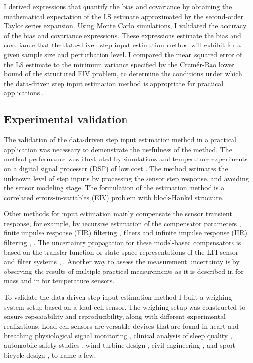 I derived expressions that quantify the bias and covariance by obtaining the mathematical expectation of the LS estimate approximated by the second-order Taylor series expansion.
Using Monte Carlo simulations, I validated the accuracy of the bias and covariance expressions.
These expressions estimate the bias and covariance that the data-driven step input estimation method will exhibit for a given sample size and perturbation level.
I compared the mean squared error of the LS estimate to the minimum variance specified by the Cram\'er-Rao lower bound of the structured EIV problem, to determine the conditions under which the data-driven step input estimation method is appropriate for practical applications \citep{QuintanaCSDA}.


\subsection{Experimental validation}

The validation of the data-driven step input estimation method in a practical application was necessary to demonstrate the usefulness of the method.
The method performance was illustrated by simulations and temperature experiments on a digital signal processor (DSP) of low cost \citep{Markovsky15cep}.
The method estimates the unknown level of step inputs by processing the sensor step response, and 
avoiding the sensor modeling stage.
The formulation of the estimation method is a correlated errors-in-variables (EIV) problem with block-Hankel structure.

Other methods for input estimation mainly compensate the sensor transient response, for example, by 
recursive estimation of the compensator parameters \citep{Shu93}, 
finite impulse response (FIR) filtering \citep{Elster07}, \citep{Niedzwiecki16b} filters and 
infinite impulse response (IIR) filtering \citep{Pintelon90}, \citep{Elster08}.
The uncertainty propagation for these model-based compensators is based on the transfer function or state-space representations of the LTI sensor and filter systems \citep{Link09}, \citep{Hale09}.
Another way to assess the measurement uncertainty is by observing the results of multiple practical measurements as it is described in \citep{Pietrzak14} for mass and in \citep{Ogorevc16} for temperature sensors.

To validate the data-driven step input estimation method I built a weighing system setup based on a load cell sensor.
The weighing setup was constructed to ensure repeatability and reproducibility, along with different experimental realizations.
Load cell sensors are versatile devices that are found in 
heart and breathing physiological signal monitoring \citep{Lee16},
clinical analysis of sleep quality \citep{Zahradka18},
automobile safety studies \citep{Ballo16},
wind turbine design \citep{Rossander15}, 
civil engineering \citep{Olmi16}, and 
sport bicycle design \citep{Casas16}, to name a few.


